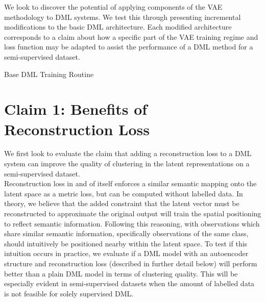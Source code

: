 \documentclass[./dissertation.tex]{subfiles}
\begin{document}
    We look to discover the potential of applying components of the VAE methodology to DML systems. We test this through presenting incremental modifications to the basic DML architecture. Each modified architecture corresponds to a claim about how a specific part of the VAE training regime and loss function may be adapted to assist the performance of a DML method for a semi-supervised dataset.
    

    \begin{algorithm}
    \caption{Base DML Training Routine}\label{alg:two}
    \end{algorithm}
     
    \section{Claim 1: Benefits of Reconstruction Loss}
    We first look to evaluate the claim that adding a reconstruction loss to a DML system can improve the quality of clustering in the latent representations on a semi-supervised dataset.  \\

    Reconstruction loss in and of itself enforces a similar semantic mapping onto the latent space as a metric loss, but can be computed  without labelled data. In theory, we believe that the added constraint that the latent vector must be reconstructed to approximate the original output will train the spatial positioning to reflect semantic information. Following this reasoning, with observations which share similar semantic information, specifically observations of the same class, should intuitively be positioned nearby within the latent space. To test if this intuition occurs in practice, we evaluate if a DML model with an autoencoder structure and reconstruction loss (described in further detail below) will perform better than a plain DML model in terms of clustering quality. This will be especially evident in semi-supervised datasets when the amount of labelled data is not feasible for solely supervised DML. \\
    
\end{document}
